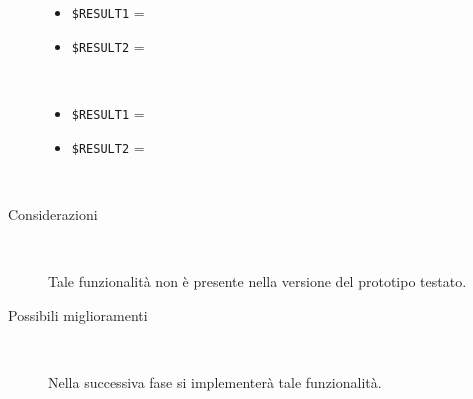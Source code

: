 \documentclass[../../Sperimentazione.tex]{subfiles}
\begin{document}
\begin{tcolorbox}[fonttitle=\bfseries, 
								adjusted title={\Large Prova 12A.1}, 
								breakable, 
								sharp corners=south,
								colback=white, 
								colframe=white!60!black]
\begin{description}[leftmargin=0.7cm,labelwidth=!]
					\tcbline        				
        				
        			\item[Output riscontrato] \ \par
        				\begin{description}
        				
        					\item[\dispositivoA] \ \par
        					\begin{itemize}
        						\item \verb|$RESULT1| = \ns
        						\item \verb|$RESULT2| = \ns
        					\end{itemize}      					
        					
        					\item[\dispositivoB] \ \par
        					\begin{itemize}
        						\item \verb|$RESULT1| = \ns
        						\item \verb|$RESULT2| = \ns
        					\end{itemize}
        					
        				\end{description}
        				
        			\tcbline
        			
        			\item[Analisi risultati] \ \par
        				\begin{description}
        					\item[Considerazioni] \ \par
        						Tale funzionalità non è presente nella versione del prototipo testato.
        					
        					\item[Possibili miglioramenti] \ \par 
        						Nella successiva fase si implementerà tale funzionalità.
        				\end{description}
        				
				\end{description}  
				
			\end{tcolorbox}



	
	\newpage	
\end{document}
